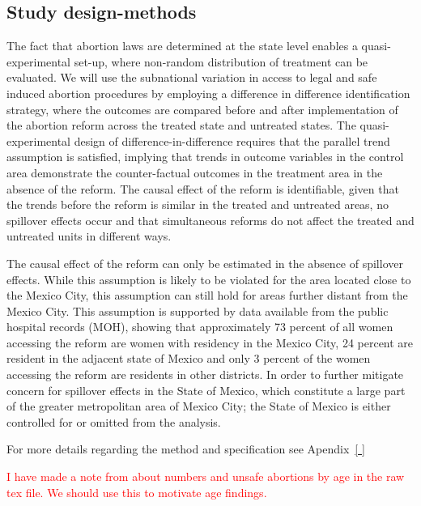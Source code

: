 \documentclass[a4paper, 11pt]{article}
\begin{document}
\begin{spacing}{1.5}
\begin{multicols}{2}
\subsection{Study design-methods}
The fact that abortion laws are determined at the state level enables a quasi-experimental set-up, where non-random distribution of treatment can be evaluated. We will use the subnational variation in access to legal and safe induced abortion procedures by employing a difference in difference identification strategy, where the outcomes are compared before and after implementation of the abortion reform across the treated state and untreated states. The quasi-experimental design of difference-in-difference requires that the parallel trend assumption is satisfied, implying that trends in outcome variables in the control area demonstrate the counter-factual outcomes in the treatment area in the absence of the reform. The causal effect of the reform is identifiable, given that the trends before the reform is similar in the treated and untreated areas, no spillover effects occur and that simultaneous reforms do not affect the treated and untreated units in different ways. 

The causal effect of the reform can only be estimated in the absence of spillover effects. While this assumption is likely to be violated for the area located close to the Mexico City, this assumption can still hold for areas further distant from the Mexico City. This assumption is supported by data available from the public hospital records (MOH), showing that approximately 73 percent of all women accessing the reform are women with residency in the Mexico City, 24 percent are resident in the adjacent state of Mexico and only 3 percent of the women accessing the reform are residents in other districts. In order to further mitigate concern for spillover effects in the State of Mexico, which constitute a large part of the greater metropolitan area of Mexico City; the State of Mexico is either controlled for or omitted from the analysis. 

For more details regarding the method and specification see Apendix~\ref{ }  

\textcolor{red}{I have made a note from \citet{Grimes2006} about numbers and 
unsafe abortions by age in the raw tex file.  We should use this to motivate
age findings.}
 

\end{multicols}
\end{spacing}
\end{document}
